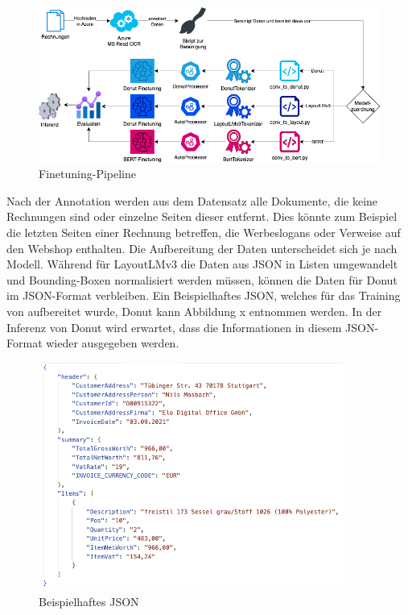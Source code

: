 \begin{figure}[]
    \centering
    \includegraphics[width=160mm]{graphics/verarbeitungspipeline.png}
    \caption[Finetuning-Pipeline]{Finetuning-Pipeline}
    \label{fig:pipeline}
\end{figure}

Nach der Annotation werden aus dem Datensatz alle Dokumente, die keine Rechnungen sind oder einzelne Seiten dieser entfernt. Dies könnte zum Beispiel die letzten Seiten einer Rechnung betreffen, die Werbeslogans oder Verweise auf den Webshop enthalten. Die Aufbereitung der Daten unterscheidet sich je nach Modell. Während für LayoutLMv3 die Daten aus JSON in Listen umgewandelt und Bounding-Boxen normalisiert werden müssen, können die Daten für Donut im JSON-Format verbleiben. Ein Beispielhaftes JSON, welches  für das Training von aufbereitet wurde, Donut kann Abbildung x entnommen werden. In der Inferenz von Donut wird erwartet, dass die Informationen in diesem JSON-Format wieder ausgegeben werden.

\begin{figure}[]
    \centering
    \includegraphics[width=100mm]{graphics/json-example.png}
    \caption[Beispielhaftes JSON]{Beispielhaftes JSON}
    \label{fig:json_example}
\end{figure}

